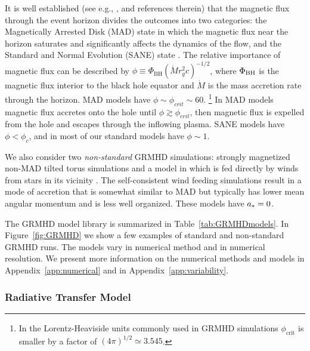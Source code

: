It is well established (see e.g., ,  and references therein) that the magnetic flux through the event horizon divides the outcomes into two categories: the Magnetically Arrested Disk (MAD) state \citep[e.g.,][]{1974Ap&SS..28...45B, Igumenschchev:2003, 2003PASJ...55L..69N} in which the magnetic flux near the horizon saturates and significantly affects the dynamics of the flow, and the Standard and Normal Evolution (SANE) state \citep[e.g.,][]{2003ApJ...589..444G, devilliers:2003, Narayan:2012}.  The relative importance of magnetic flux can be described by $\phi \equiv \Phi_{\mathrm{BH}} (\dot{M} r_g^2 c)^{-1/2}$, where $\Phi_{\rm BH}$ is the magnetic flux interior to the black hole equator and $\dot{M}$ is the mass accretion rate through the horizon. MAD models have $\phi \sim \phi_{crit} \sim 60$. \footnote{In the Lorentz-Heaviside units commonly used in GRMHD simulations $\phi_\mathrm{crit}$ is smaller by a factor of $(4\pi)^{1/2} \simeq 3.545$.}  In MAD models magnetic flux accretes onto the hole until $\phi \gtrsim \phi_{crit}$, then magnetic flux is expelled from the hole and escapes through the inflowing plasma.  SANE models have $\phi < \phi_c$, and in most of our standard models have $\phi \sim 1$.

We also consider two {\it non-standard} GRMHD simulations: strongly magnetized non-MAD tilted torus simulations \citep{ref} and a model in which \sgra is fed directly by winds from stars in its vicinity \citep{2020ApJ...896L...6R}. The self-consistent wind feeding simulations result in a mode of accretion that is somewhat similar to MAD but typically has lower mean angular momentum and is less well organized.
These models have $a_* = 0$.

The GRMHD model library is summarized in Table~\ref{tab:GRMHDmodels}. In Figure~\ref{fig:GRMHD} we show a few examples of standard and non-standard GRMHD runs. The models vary in numerical method and in numerical resolution. We present more information on the numerical methods and models in Appendix~\ref{app:numerical} and in  Appendix~\ref{app:variability}.

\subsubsection{Radiative Transfer Model}

